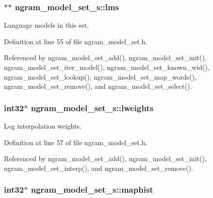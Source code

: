 \subsubsection[{lms}]{$\ast$$\ast$ ngram\-\_\-model\-\_\-set\-\_\-s\-::lms}\label{structngram__model__set__s_a862d4c4feb5a903101f4a0fdc5ba8a62}


Language models in this set. 



Definition at line 55 of file ngram\-\_\-model\-\_\-set.\-h.



Referenced by ngram\-\_\-model\-\_\-set\-\_\-add(), ngram\-\_\-model\-\_\-set\-\_\-init(), ngram\-\_\-model\-\_\-set\-\_\-iter\-\_\-model(), ngram\-\_\-model\-\_\-set\-\_\-known\-\_\-wid(), ngram\-\_\-model\-\_\-set\-\_\-lookup(), ngram\-\_\-model\-\_\-set\-\_\-map\-\_\-words(), ngram\-\_\-model\-\_\-set\-\_\-remove(), and ngram\-\_\-model\-\_\-set\-\_\-select().

\subsubsection[{lweights}]{\setlength{\rightskip}{0pt plus 5cm}int32$\ast$ ngram\-\_\-model\-\_\-set\-\_\-s\-::lweights}\label{structngram__model__set__s_a11068bb0029c788c506bec4507dd6d23}


Log interpolation weights. 



Definition at line 57 of file ngram\-\_\-model\-\_\-set.\-h.



Referenced by ngram\-\_\-model\-\_\-set\-\_\-add(), ngram\-\_\-model\-\_\-set\-\_\-init(), ngram\-\_\-model\-\_\-set\-\_\-interp(), and ngram\-\_\-model\-\_\-set\-\_\-remove().

\subsubsection[{maphist}]{\setlength{\rightskip}{0pt plus 5cm}int32$\ast$ ngram\-\_\-model\-\_\-set\-\_\-s\-::maphist}\label{structngram__model__set__s_af34ca232338c2d8c7dc8d13869ac09fd}



